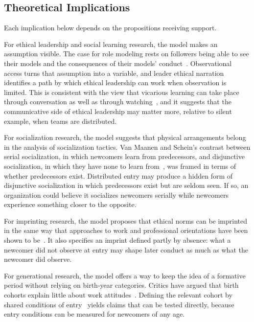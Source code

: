 \subsection{Theoretical Implications}

Each implication below depends on the propositions receiving support.

For ethical leadership and social learning research, the model makes an assumption visible. The case for role modeling rests on followers being able to see their models and the consequences of their models' conduct~\citep{brown2005ethical,brown2006ethical}. Observational access turns that assumption into a variable, and leader ethical narration identifies a path by which ethical leadership can work when observation is limited. This is consistent with the view that vicarious learning can take place through conversation as well as through watching~\citep{myers2018coactive}, and it suggests that the communicative side of ethical leadership may matter more, relative to silent example, when teams are distributed.

For socialization research, the model suggests that physical arrangements belong in the analysis of socialization tactics. Van Maanen and Schein's contrast between serial socialization, in which newcomers learn from predecessors, and disjunctive socialization, in which they have none to learn from~\citep{vanmaanen1979toward}, was framed in terms of whether predecessors exist. Distributed entry may produce a hidden form of disjunctive socialization in which predecessors exist but are seldom seen. If so, an organization could believe it socializes newcomers serially while newcomers experience something closer to the opposite.

For imprinting research, the model proposes that ethical norms can be imprinted in the same way that approaches to work and professional orientations have been shown to be~\citep{tilcsik2014imprint,azoulay2017social}. It also specifies an imprint defined partly by absence: what a newcomer did not observe at entry may shape later conduct as much as what the newcomer did observe.

For generational research, the model offers a way to keep the idea of a formative period without relying on birth-year categories. Critics have argued that birth cohorts explain little about work attitudes~\citep{costanza2015generationally,rudolph2017considering}. Defining the relevant cohort by shared conditions of entry~\citep{joshi2010unpacking} yields claims that can be tested directly, because entry conditions can be measured for newcomers of any age.


